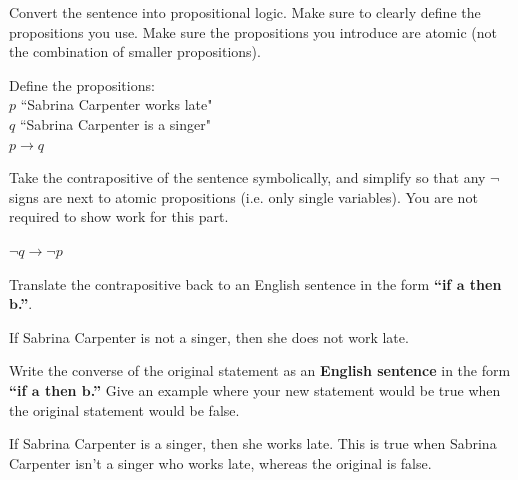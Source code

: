 \documentclass[homework, problems]{../../latex-common/cs151-common}
\begin{document}
\begin{enumeratequestions}
\item Convert the sentence into propositional logic. Make sure to clearly define the propositions you use. Make sure the propositions you introduce are atomic (not the combination of smaller propositions).
\begin{solution}
    Define the propositions: \\
    $p$ \quad ``Sabrina Carpenter works late" \\
    $q$ \quad ``Sabrina Carpenter is a singer" \\
    $p \rightarrow q$
\end{solution}

\item Take the contrapositive of the sentence symbolically, and simplify so that any $\neg$ signs are next to atomic propositions
(i.e. only single variables). You are not required to show work for this part. 
\begin{solution}
    $\neg q \rightarrow \neg p$
\end{solution}

\item Translate the contrapositive back to an English sentence in the form \textbf{``if $\bm{a}$ then $\bm{b}$.”}.
\begin{solution}
    If Sabrina Carpenter is not a singer, then she does not work late.
\end{solution}

\item Write the converse of the original statement as an \textbf{English sentence} in the form \textbf{``if $\bm{a}$ then $\bm{b}$.”} Give an example where your new statement would be true when the original statement would be false.
\begin{solution}
If Sabrina Carpenter is a singer, then she works late. This is true when Sabrina Carpenter isn't a singer who works late, whereas the original is false.
\end{solution}
\end{enumeratequestions}
\end{document}
